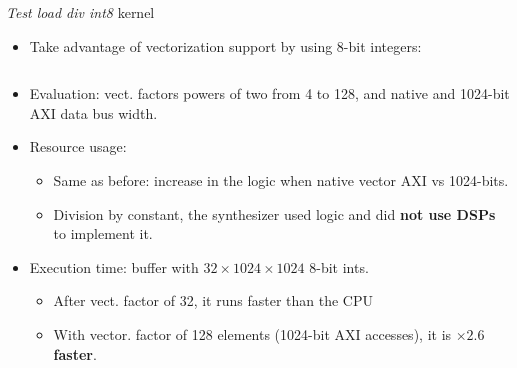 \documentclass[8pt,a4paper,oneside,hidelinks,aspectratio=169,dvipsnames]{beamer}
\begin{document}
\begin{frame}{\textit{Test load div int8} kernel}
  \begin{itemize}
    \item Take advantage of vectorization support by using 8-bit integers:
          \begin{figure}[H]
            \centering
            \begin{minipage}{0.3\textwidth}
              \inputminted[tabsize=2,frame=single,rulecolor=gray,fontsize=\fontsize{5}{5}]{cpp}{fig/test_load_div_int8.cpp}
            \end{minipage}
          \end{figure}
    \item Evaluation: vect. factors powers of two from 4 to 128, and native and 1024-bit AXI data bus width.
    \item Resource usage:
          \begin{table}[Ht]
            \makebox[\linewidth]{
              \scalebox{.333}{}
              \scalebox{.333}{}
              \scalebox{.333}{}
            }
          \end{table}
          \begin{itemize}
            \item Same as before: increase in the logic when native vector AXI vs 1024-bits.
            \item Division by constant, the synthesizer used logic and did \textbf{not use DSPs} to implement it.
          \end{itemize}
    \item Execution time: buffer with $32 \times 1024 \times 1024$ 8-bit ints.
          \begin{table}[H]
            \centering
            \scalebox{.333}{}
          \end{table}
          \begin{itemize}
            \item After vect. factor of 32, it runs faster than the CPU
            \item With vector. factor of 128 elements (1024-bit AXI accesses), it is \textbf{$\times 2.6$ faster}.
          \end{itemize}
  \end{itemize}
\end{frame}
\end{document}
